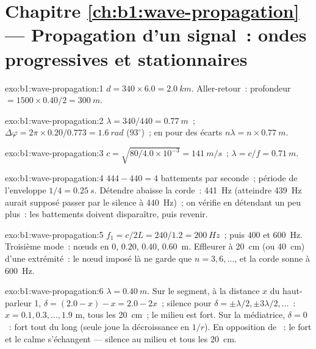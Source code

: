 \section*{Chapitre \ref{ch:b1:wave-propagation} --- Propagation d'un signal~: ondes progressives et stationnaires}

\begin{solution}{exo:b1:wave-propagation:1}
$d = 340 \times 6.0 = \qty{2.0}{km}$. Aller-retour~: profondeur $= 1500 \times
0.40/2 = \qty{300}{m}$.
\end{solution}

\begin{solution}{exo:b1:wave-propagation:2}
$\lambda = 340/440 = \qty{0.77}{m}$~; $\Delta\varphi = 2\pi \times
0.20/0.773 = \qty{1.6}{rad}$ ($93^\circ$)~; en  pour des écarts
$n\lambda = n \times \qty{0.77}{m}$.
\end{solution}

\begin{solution}{exo:b1:wave-propagation:3}
$c = \sqrt{80/4.0\times10^{-3}} = \qty{141}{m/s}$~; $\lambda = c/f =
\qty{0.71}{m}$.
\end{solution}

\begin{solution}{exo:b1:wave-propagation:4}
$444 - 440 = 4$ battements par seconde~; période de l'enveloppe $1/4 = \qty{0.25}{s}$.
Détendre abaisse la corde~: \qty{441}{Hz} (atteindre \qty{439}{Hz} aurait
supposé passer par le silence à \qty{440}{Hz})~; on vérifie en détendant
un peu plus~: les battements doivent disparaître, puis revenir.
\end{solution}

\begin{solution}{exo:b1:wave-propagation:5}
$f_1 = c/2L = 240/1.2 = \qty{200}{Hz}$~; puis $400$ et \qty{600}{Hz}.
Troisième mode~: nœuds en $0$, $0.20$, $0.40$, \qty{0.60}{m}. Effleurer à
\qty{20}{cm} (ou \qty{40}{cm}) d'une extrémité~: le nœud imposé là ne
garde que $n = 3, 6, \dots$, et la corde sonne à \qty{600}{Hz}.
\end{solution}

\begin{solution}{exo:b1:wave-propagation:6}
$\lambda = \qty{0.40}{m}$. Sur le segment, à la distance $x$ du
haut-parleur 1, $\delta = (2.0 - x) - x = 2.0 - 2x$~; silence pour $\delta = \pm\lambda/2,
\pm 3\lambda/2, \dots$~: $x = 0.1, 0.3, \dots, 1.9$ m, tous les \qty{20}{cm}~;
le milieu est fort. Sur la médiatrice, $\delta = 0$~: fort tout du long
(seule joue la décroissance en $1/r$). En opposition de ~: le fort
et le calme s'échangent --- silence au milieu et tous les \qty{20}{cm}.
\end{solution}

